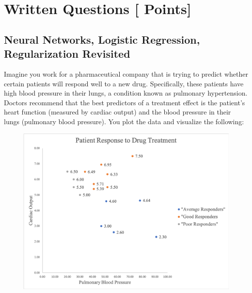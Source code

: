 \documentclass[11pt,addpoints,answers]{exam}
\begin{document}
\clearpage

\section{Written Questions [\numpoints{} Points]}
\subsection{Neural Networks, Logistic Regression, Regularization Revisited}
    Imagine you work for a pharmaceutical company that is trying to predict whether certain patients will respond well to a new drug. Specifically, these patients have high blood pressure in their lungs, a condition known as pulmonary hypertension. Doctors recommend that the best predictors of a treatment effect is the patient's heart function (measured by cardiac output) and the blood pressure in their lungs (pulmonary blood pressure). You plot the data and visualize the following:
    
    \begin{figure}[H]
    \centering
    \includegraphics[width=1\textwidth]{figs/patients.png}
    \end{figure}
\end{document}
